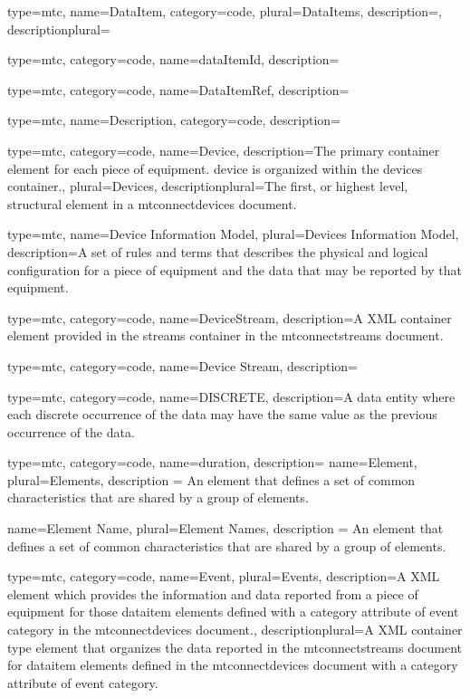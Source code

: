 {
  type=mtc,
  name={DataItem},
  category=code,
  plural={DataItems},
  description={},
  descriptionplural={}
}

{
  type=mtc,
  category=code,
  name={dataItemId},
  description={}
}

{
type=mtc,
category=code,
name={DataItemRef},
description={}
}

{
  type=mtc,
  name={Description},
  category=code,
  description={}
}

{
  type=mtc,
  category=code,
  name={Device},
  description={The primary container element for each piece of equipment. \gls{device} is organized within the \glspl{device}  container.},
  plural={Devices},
  descriptionplural={The first, or highest level, \gls{structural element} in a \glspl{mtconnectdevice} document.}
}

{
  type=mtc,
  name={Device Information Model},
  plural={Devices Information Model},
  description={A set of rules and terms that describes the physical and logical configuration for a piece of equipment and the data that may be reported by that equipment.}
}

{
  type=mtc,
  category=code,
  name={DeviceStream},
  description={A XML container element provided in the \glspl{stream} container in the \glspl{mtconnectstream} document.}
}

{
  type=mtc,
  category=code,
  name={Device Stream},
  description={}
}

{
  type=mtc,
  category=code,
  name={DISCRETE},
  description={A \gls{data entity} where each discrete occurrence of the data may have the same value as the previous occurrence of the data.}
}

{
  type=mtc,
  category=code,
  name={duration},
  description={}
}
{
    name={Element},
    plural={Elements},
    description = {An element that defines a set of common characteristics that are shared by a group of elements.}
}

{
    name={Element Name},
    plural={Element Names},
    description = {An element that defines a set of common characteristics that are shared by a group of elements.}
}

{
  type=mtc,
  category=code,
  name={Event},
  plural={Events},
  description={A XML element which provides the information and data reported from a piece of equipment for those \gls{dataitem} elements defined with a \gls{category} attribute of \gls{event category} in the \glspl{mtconnectdevice} document.},
  descriptionplural={A XML container type element that organizes the data reported in the \glspl{mtconnectstream} document for \gls{dataitem} elements defined in the \glspl{mtconnectdevice} document with a \gls{category} attribute of \gls{event category}.}
}


